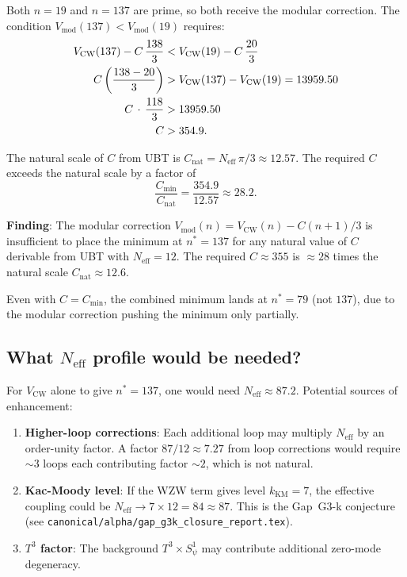 \documentclass[12pt,a4paper]{article}
\theoremstyle{definition}
\theoremstyle{remark}
\newcommand{\Neff}{N_{\mathrm{eff}}}
\newcommand{\VCW}{V_{\mathrm{CW}}}
\begin{document}
Both $n=19$ and $n=137$ are prime, so both receive the modular correction.
The condition $V_{\mathrm{mod}}(137) < V_{\mathrm{mod}}(19)$ requires:
\begin{align}
  \VCW(137) - C\,\frac{138}{3}
  &< \VCW(19) - C\,\frac{20}{3} \notag\\
  C\left(\frac{138-20}{3}\right)
  &> \VCW(137) - \VCW(19) = 13959.50 \notag\\
  C\,\cdot\,\frac{118}{3} &> 13959.50 \notag\\
  C &> 354.9 .
  \label{eq:C_needed}
\end{align}

The natural scale of $C$ from UBT is $C_{\mathrm{nat}} = \Neff\,\pi/3 \approx 12.57$.
The required $C$ exceeds the natural scale by a factor of
\begin{equation}
  \frac{C_{\mathrm{min}}}{C_{\mathrm{nat}}} = \frac{354.9}{12.57} \approx 28.2 .
  \label{eq:C_ratio}
\end{equation}

\begin{gapbox}
\textbf{Finding}: The modular correction $V_{\mathrm{mod}}(n) = \VCW(n) - C(n+1)/3$
is insufficient to place the minimum at $n^*=137$ for any natural value of $C$
derivable from UBT with $\Neff=12$.  The required $C \approx 355$ is $\approx 28$
times the natural scale $C_{\mathrm{nat}} \approx 12.6$.

Even with $C = C_{\mathrm{min}}$, the combined minimum lands at $n^*=79$
(not $137$), due to the modular correction pushing the minimum only partially.
\end{gapbox}

\subsection{What $\Neff$ profile would be needed?}

For $\VCW$ alone to give $n^*=137$, one would need $\Neff \approx 87.2$.
Potential sources of enhancement:
\begin{enumerate}
  \item \textbf{Higher-loop corrections}: Each additional loop may multiply
        $\Neff$ by an order-unity factor.  A factor $87/12 \approx 7.27$ from
        loop corrections would require $\sim 3$ loops each contributing factor
        $\sim 2$, which is not natural.
  \item \textbf{Kac-Moody level}: If the WZW term gives level $k_{\mathrm{KM}} = 7$,
        the effective coupling could be $\Neff \to 7 \times 12 = 84 \approx 87$.
        This is the Gap~G3-k conjecture (see
        \texttt{canonical/alpha/gap\_g3k\_closure\_report.tex}).
  \item \textbf{$T^3$ factor}: The background $T^3 \times S^1_\psi$ may
        contribute additional zero-mode degeneracy.
\end{enumerate}
\end{document}
